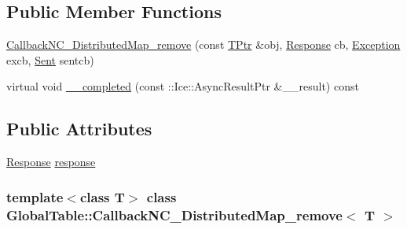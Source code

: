\subsection*{Public Member Functions}
\begin{DoxyCompactItemize}
\item 
\hyperlink{class_global_table_1_1_callback_n_c___distributed_map__remove_ada90e97586828f232a5a551cd68fb438}{CallbackNC\_\-DistributedMap\_\-remove} (const \hyperlink{class_global_table_1_1_callback_n_c___distributed_map__remove_a5ae7d6daca40ba4c93198ac3fef691ae}{TPtr} \&obj, \hyperlink{class_global_table_1_1_callback_n_c___distributed_map__remove_a7a067fa8583ce4e7507e4c0601f9800d}{Response} cb, \hyperlink{class_global_table_1_1_callback_n_c___distributed_map__remove_a6af61b5cc432f624acfd6a7cbf2ace31}{Exception} excb, \hyperlink{class_global_table_1_1_callback_n_c___distributed_map__remove_afd84ad88b313577ef250caab113b43a3}{Sent} sentcb)
\item 
virtual void \hyperlink{class_global_table_1_1_callback_n_c___distributed_map__remove_a71122f6737ab3b9dd3a63730503b2264}{\_\-\_\-completed} (const ::Ice::AsyncResultPtr \&\_\-\_\-result) const 
\end{DoxyCompactItemize}
\subsection*{Public Attributes}
\begin{DoxyCompactItemize}
\item 
\hyperlink{class_global_table_1_1_callback_n_c___distributed_map__remove_a7a067fa8583ce4e7507e4c0601f9800d}{Response} \hyperlink{class_global_table_1_1_callback_n_c___distributed_map__remove_a53f8e4b9c2bbc86922abd8cda98dda03}{response}
\end{DoxyCompactItemize}
\subsubsection*{template$<$class T$>$ class GlobalTable::CallbackNC\_\-DistributedMap\_\-remove$<$ T $>$}



